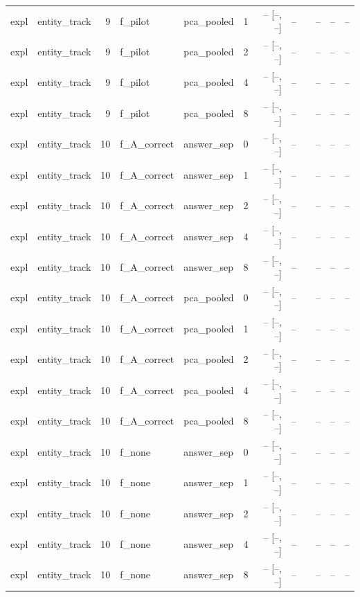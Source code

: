 \begin{tabular}{llrllrrrlrrr}
expl & entity\_track & 9 & f\_pilot & pca\_pooled & 1 & -- [--, --] & -- &  & -- & -- & -- \\
expl & entity\_track & 9 & f\_pilot & pca\_pooled & 2 & -- [--, --] & -- &  & -- & -- & -- \\
expl & entity\_track & 9 & f\_pilot & pca\_pooled & 4 & -- [--, --] & -- &  & -- & -- & -- \\
expl & entity\_track & 9 & f\_pilot & pca\_pooled & 8 & -- [--, --] & -- &  & -- & -- & -- \\
expl & entity\_track & 10 & f\_A\_correct & answer\_sep & 0 & -- [--, --] & -- &  & -- & -- & -- \\
expl & entity\_track & 10 & f\_A\_correct & answer\_sep & 1 & -- [--, --] & -- &  & -- & -- & -- \\
expl & entity\_track & 10 & f\_A\_correct & answer\_sep & 2 & -- [--, --] & -- &  & -- & -- & -- \\
expl & entity\_track & 10 & f\_A\_correct & answer\_sep & 4 & -- [--, --] & -- &  & -- & -- & -- \\
expl & entity\_track & 10 & f\_A\_correct & answer\_sep & 8 & -- [--, --] & -- &  & -- & -- & -- \\
expl & entity\_track & 10 & f\_A\_correct & pca\_pooled & 0 & -- [--, --] & -- &  & -- & -- & -- \\
expl & entity\_track & 10 & f\_A\_correct & pca\_pooled & 1 & -- [--, --] & -- &  & -- & -- & -- \\
expl & entity\_track & 10 & f\_A\_correct & pca\_pooled & 2 & -- [--, --] & -- &  & -- & -- & -- \\
expl & entity\_track & 10 & f\_A\_correct & pca\_pooled & 4 & -- [--, --] & -- &  & -- & -- & -- \\
expl & entity\_track & 10 & f\_A\_correct & pca\_pooled & 8 & -- [--, --] & -- &  & -- & -- & -- \\
expl & entity\_track & 10 & f\_none & answer\_sep & 0 & -- [--, --] & -- &  & -- & -- & -- \\
expl & entity\_track & 10 & f\_none & answer\_sep & 1 & -- [--, --] & -- &  & -- & -- & -- \\
expl & entity\_track & 10 & f\_none & answer\_sep & 2 & -- [--, --] & -- &  & -- & -- & -- \\
expl & entity\_track & 10 & f\_none & answer\_sep & 4 & -- [--, --] & -- &  & -- & -- & -- \\
expl & entity\_track & 10 & f\_none & answer\_sep & 8 & -- [--, --] & -- &  & -- & -- & -- \\

\end{tabular}
